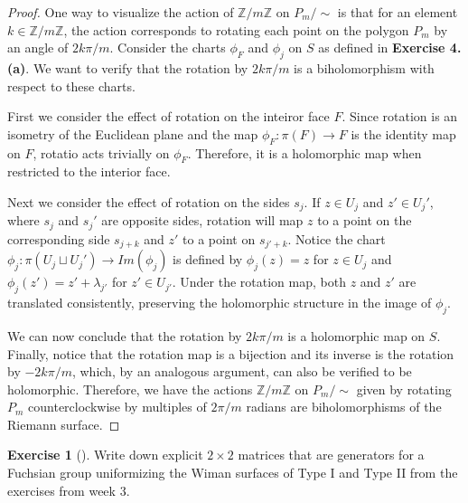 \documentclass[reqno]{amsart}
\theoremstyle{definition}
\newtheorem{exercise}[theorem]{Exercise}
\theoremstyle{remark}
\begin{document}
\begin{proof}
    One way to visualize the action of $\mathbb{Z} / m\mathbb{Z}$ on $P_m / \sim$ is that for an element $k \in \mathbb{Z} / m\mathbb{Z}$, the action corresponds to rotating each point on the polygon $P_m$ by an angle of $2k \pi / m$. Consider the charts $\phi_F$ and $\phi_j$ on $S$ as defined in \textbf{Exercise 4.(a)}. We want to verify that the rotation by  $2k \pi / m$ is a biholomorphism with respect to these charts. \par
    First we consider the effect of rotation on the inteiror face $F$. Since rotation is an isometry of the Euclidean plane and the map $\phi_F: \pi(F) \rightarrow F$ is the identity map on $F$, rotatio acts trivially on $\phi_F$. Therefore, it is a holomorphic map when restricted to the interior face. \par
    Next we consider the effect of rotation on the sides $s_j$. If $z \in U_j$ and $z' \in U_j'$, where $s_j$ and $s_j'$ are opposite sides, rotation will map $z$ to a point on the corresponding side $s_{j + k}$ and $z'$ to a point on $s_{j' + k}$. Notice the chart $\phi_j: \pi(U_j \sqcup U_j') \rightarrow Im(\phi_j)$ is defined by $\phi_j(z) = z$ for $z \in U_j$ and $\phi_j(z') = z' + \lambda_{j'}$ for $z' \in U_{j'}$. Under the rotation map, both $z$ and $z'$ are translated consistently, preserving the holomorphic structure in the image of $\phi_j$. \par
    We can now conclude that the rotation by $2k\pi /m$ is a holomorphic map on $S$. Finally, notice that the rotation map is a bijection and its inverse is the rotation by $-2k\pi / m$, which, by an analogous argument, can also be verified to be holomorphic. Therefore, we have the actions $\mathbb{Z} / m\mathbb{Z}$ on $P_m / \sim$ given by rotating $P_m$ counterclockwise by multiples of $2\pi/ m$ radians are biholomorphisms of the Riemann surface.

\end{proof}

\begin{exercise}[]\label{fuchsian-group-for-wiman-surfaces}
        Write down explicit $2 \times 2$ matrices that are generators for
        a Fuchsian group uniformizing the Wiman surfaces of Type I and Type
        II from the exercises from week 3.
    \end{exercise}
\end{document}
